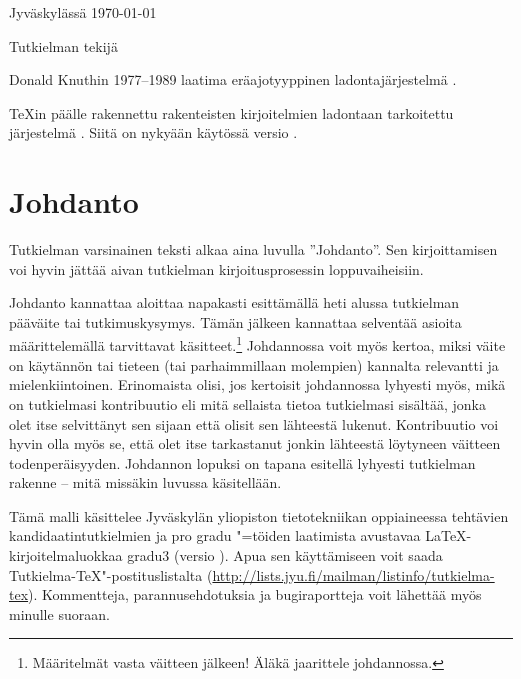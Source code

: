 \documentclass[utf8]{gradu3-tjt}
\begin{document}
Jyväskylässä \today

\bigskip

Tutkielman tekijä

\begin{thetermlist}
\item[\TeX] Donald Knuthin 1977--1989 laatima eräajotyyppinen
  ladontajärjestelmä \parencite[ks.][]{knuth86:_texbook}. 
\item[\LaTeX] \TeX in \parencite[ks.][]{knuth86:_texbook} päälle
  rakennettu rakenteisten kirjoitelmien ladontaan tarkoitettu
  järjestelmä \parencite[ks.][]{lamport94:_latex}.  Siitä on nykyään
  käytössä versio \LaTeXe.
\end{thetermlist}

\mainmatter

\chapter{Johdanto}

Tutkielman varsinainen teksti alkaa aina luvulla ''Johdanto''.  Sen
kirjoittamisen voi hyvin jättää aivan tutkielman kirjoitusprosessin
loppuvaiheisiin.

Johdanto kannattaa aloittaa napakasti esittämällä heti alussa
tutkielman pääväite tai tutkimuskysymys.  Tämän jälkeen kannattaa
selventää asioita määrittelemällä tarvittavat
käsitteet.\footnote{Määritelmät vasta väitteen jälkeen! Äläkä
  jaarittele johdannossa.}  Johdannossa voit myös kertoa, miksi väite
on käytännön tai tieteen (tai parhaimmillaan molempien) kannalta
relevantti ja mielenkiintoinen.  Erinomaista olisi, jos kertoisit
johdannossa lyhyesti myös, mikä on tutkielmasi kontribuutio eli mitä
sellaista tietoa tutkielmasi sisältää, jonka olet itse selvittänyt sen
sijaan että olisit sen lähteestä lukenut.  Kontribuutio voi hyvin olla
myös se, että olet itse tarkastanut jonkin lähteestä löytyneen
väitteen todenperäisyyden.  Johdannon lopuksi on tapana esitellä
lyhyesti tutkielman rakenne -- mitä missäkin luvussa käsitellään.

Tämä malli käsittelee Jyväskylän yliopiston tietotekniikan oppiaineessa
tehtävien kandidaatintutkielmien ja pro gradu "=töiden laatimista
avustavaa \LaTeX-kirjoitelmaluokkaa gradu3 (versio \graduclsversion).
Apua sen käyttämiseen voit saada Tutkielma-TeX"-postituslistalta
(\url{http://lists.jyu.fi/mailman/listinfo/tutkielma-tex}).
Kommentteja, parannusehdotuksia ja bugiraportteja voit lähettää myös
minulle suoraan.
\end{document}
